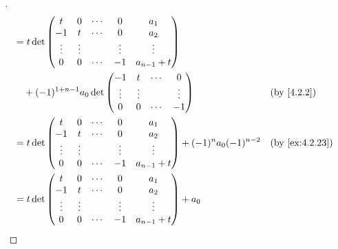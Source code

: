 \begin{proof}[]
\begin{align*}
     & = t \det\begin{pmatrix}
                 t      & 0      & \cdots & 0      & a_1           \\
                 -1     & t      & \cdots & 0      & a_2           \\
                 \vdots & \vdots &        & \vdots & \vdots        \\
                 0      & 0      & \cdots & -1     & a_{n - 1} + t
               \end{pmatrix}                                                                      \\
     & \quad + (-1)^{1 + n - 1} a_0 \det\begin{pmatrix}
                                          -1     & t      & \cdots & 0      \\
                                          \vdots & \vdots &        & \vdots \\
                                          0      & 0      & \cdots & -1
                                        \end{pmatrix}                                                &  & \text{(by \cref{4.2.2})}    \\
     & = t \det\begin{pmatrix}
                 t      & 0      & \cdots & 0      & a_1           \\
                 -1     & t      & \cdots & 0      & a_2           \\
                 \vdots & \vdots &        & \vdots & \vdots        \\
                 0      & 0      & \cdots & -1     & a_{n - 1} + t
               \end{pmatrix} + (-1)^n a_0 (-1)^{n - 2}                                            &  & \text{(by \cref{ex:4.2.23})}   \\
     & = t \det\begin{pmatrix}
                 t      & 0      & \cdots & 0      & a_1           \\
                 -1     & t      & \cdots & 0      & a_2           \\
                 \vdots & \vdots &        & \vdots & \vdots        \\
                 0      & 0      & \cdots & -1     & a_{n - 1} + t
               \end{pmatrix} + a_0                                                                      \\

\end{align*}
\end{proof}

